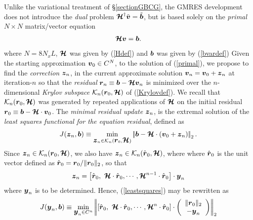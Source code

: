 Unlike the variational treatment of \S\ref{sectionGBCG}, the GMRES 
development does not introduce the {\em dual\/} problem
${\CB H}^{\dagger}\tilde{\bmi  v}=\tilde{\bmi  b}$, but is based solely 
on the {\em 
primal\/}  $N \times N$ matrix/vector equation 
\begin{equation} \label{primal}
{\CB H}{\bmi  v}={\bmi  b}. 
\end{equation}
where $N=8 N_x L$,  ${\CB H}$ was given by (\ref{Hdef}) and ${\bmi  b}$ 
was given by 
(\ref{bvardef})
Given the starting approximation ${\bmi  v}_{0}\in C^{N}$, to the solution 
of
(\ref{primal}), we propose to find the {\em correction\/} ${\bmi  z}_{n}$,
in the current approximate solution  ${\bmi  v}_{n}={\bmi  v}_{0}+{\bmi  
z}_{n}$ at iteration-$n$ so 
that the {\em residual\/} ${\bmi  r}_{n}\equiv{\bmi  b}-{\CB H}{\bmi  
v}_{n}$ is 
minimized over the $n$-dimensional {\em Krylov subspace\/} ${\cal 
K}_{n}({\bmi  r}_{0},
{\CB H})$
 of (\ref {Krylovdef}). We recall that ${\cal K}_{n}({\bmi  r}_{0},{\CB 
H})$ was 
 generated by repeated applications of ${\CB H}$ on the initial residual 
${\bmi  r}_{0}\equiv {\bmi  b}-{\CB H} \cdot {\bmi  v}_{0}$. The {\em 
minimal 
residual update\/} ${\bmi  z}_{n}$, is the  extremal solution of the
{\em least squares functional for the equation residual\/}, defined as
\begin{equation} \label{leastsquares}
J({\bmi  z}_{n},{\bmi  b}) \equiv  \min_{{\bmi  z}_{n}\in 
{\cal K}_{n}({\bmi  r}_{0},{\CB H})} 
\left|\!\left|
{{\bmi  b}-{\CB H} \cdot \left({\bmi  v}_{0} +{\bmi  z}_{n} 
\right)}\right|\!\right|_{2}.
\end{equation}
Since  ${\bmi  z}_{n}\in {\cal K}_{n}({\bmi  r}_{0},{\CB H})$, we also have
${\bmi  z}_{n}\in {\cal K}_{n}(\hat{\bmi  r}_{0},{\CB H})$, where 
where 
$\hat{\bmi  r}{}_{ 0}$ is the unit vector defined as  $\hat{\bmi  r}{}_{ 
0}= {\bmi  r}{}_{ 
0}/\| {\bmi  r}{}_{0} \|_{2}$, so that
\[
{\bmi  z}_{n}=\left[{\hat{\bmi  r}_{0},\ {\CB H} \cdot \hat{\bmi  r}_{ 0} 
,\cdots 
,{\CB H}^{n-1} \cdot \hat{\bmi  r}_{ 0}}\right]\cdot{\bmi  y}_{n}
\] 
where ${\bmi  y}_{n}$ is to be determined.
Hence, (\ref{leastsquares}) 
may be rewritten as
\begin{equation} \label{leastsquares2}
J({\bmi  y}_{n},{\bmi  b}) \equiv  \min_{{\bmi  y}_{n}\in C^{n}} 
\left|\!\left|
\left[{ \hat{\bmi  r}{}_{0},\ {\CB H} \cdot \hat{\bmi  r}{}_{ 0} ,\cdots 
,{\CB H}^{n} \cdot \hat{\bmi  r}{}_{ 0}}\right]\cdot\left(\begin{array}{c}
\| {\bmi  r}{}_{0} \|_{2}\\
-{\bmi  y}_{n}
\end{array} \right)
\right|\!\right|_{2}
\end{equation}




